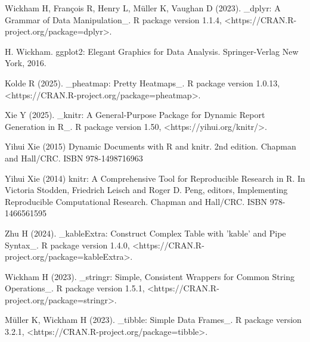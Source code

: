 \documentclass{article}
\begin{document}
Wickham H, François R, Henry L, Müller K, Vaughan D (2023). _dplyr: A
  Grammar of Data Manipulation_. R package version 1.1.4,
  <https://CRAN.R-project.org/package=dplyr>.

H. Wickham. ggplot2: Elegant Graphics for Data Analysis. Springer-Verlag
  New York, 2016.

Kolde R (2025). _pheatmap: Pretty Heatmaps_. R package version 1.0.13,
  <https://CRAN.R-project.org/package=pheatmap>.

Xie Y (2025). _knitr: A General-Purpose Package for Dynamic Report
  Generation in R_. R package version 1.50, <https://yihui.org/knitr/>.

Yihui Xie (2015) Dynamic Documents with R and knitr. 2nd edition. Chapman
  and Hall/CRC. ISBN 978-1498716963

Yihui Xie (2014) knitr: A Comprehensive Tool for Reproducible Research in
  R. In Victoria Stodden, Friedrich Leisch and Roger D. Peng, editors,
  Implementing Reproducible Computational Research. Chapman and Hall/CRC.
  ISBN 978-1466561595

Zhu H (2024). _kableExtra: Construct Complex Table with 'kable' and Pipe
  Syntax_. R package version 1.4.0,
  <https://CRAN.R-project.org/package=kableExtra>.

Wickham H (2023). _stringr: Simple, Consistent Wrappers for Common String
  Operations_. R package version 1.5.1,
  <https://CRAN.R-project.org/package=stringr>.

Müller K, Wickham H (2023). _tibble: Simple Data Frames_. R package
  version 3.2.1, <https://CRAN.R-project.org/package=tibble>.
  
\end{document}
